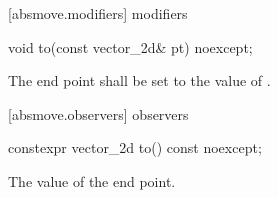  [absmove.modifiers]{ modifiers}

\begin{itemdecl}
void to(const vector_2d& pt) noexcept;
\end{itemdecl}
\begin{itemdescr}
\pnum
\effects
The end point shall be set to the value of .
\end{itemdescr}

 [absmove.observers]{ observers}

\begin{itemdecl}
constexpr vector_2d to() const noexcept;
\end{itemdecl}
\begin{itemdescr}
\pnum
\returns
The value of the end point.
\end{itemdescr}
